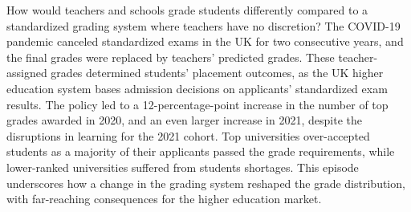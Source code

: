 
How would teachers and schools grade students differently compared to a standardized grading system where teachers have no discretion? The COVID-19 pandemic canceled standardized exams in the UK for two consecutive years, and the final grades were replaced by teachers’ predicted grades. These teacher-assigned grades determined students’ placement outcomes, as the UK higher education system bases admission decisions on applicants’ standardized exam results. The policy led to a 12-percentage-point increase in the number of top grades awarded in 2020, and an even larger increase in 2021, despite the disruptions in learning for the 2021 cohort. Top universities over-accepted students as a majority of their applicants passed the grade requirements, while lower-ranked universities suffered from students shortages. This episode underscores how a change in the grading system reshaped the grade distribution, with far-reaching consequences for the higher education market.

